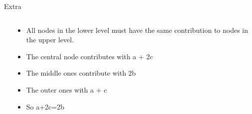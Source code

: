 \documentclass{beamer}
\begin{document}
\begin{frame}{Extra}
{\begin{columns}
\begin{column}{0.3\textwidth}
            \end{column}
            \begin{column}{0.6\textwidth}
                \begin{itemize}
                    \tiny
                    \item All nodes in the lower level must have the same contribution to nodes in the upper level. 
                    \item The central node contributes with a + 2c
                    \item The middle ones contribute with 2b
                    \item The outer ones with a + c
                    \item So a+2c=2b
                \end{itemize}
            \end{column}
        \end{columns}
    }
    

\end{frame}
\end{document}
